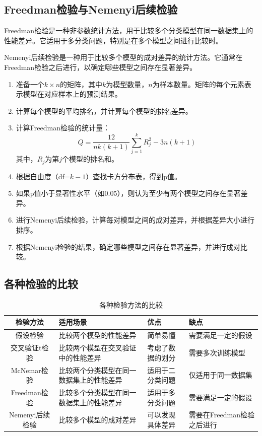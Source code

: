 \subsection{Freedman检验与Nemenyi后续检验}
Freedman检验是一种非参数统计方法，用于比较多个分类模型在同一数据集上的性能差异。它适用于多分类问题，特别是在多个模型之间进行比较时。

Nemenyi后续检验是一种用于比较多个模型的成对差异的统计方法。它通常在Freedman检验之后进行，以确定哪些模型之间存在显著差异。
\begin{enumerate}
    \item 准备一个$k \times n$的矩阵，其中$k$为模型数量，$n$为样本数量。矩阵的每个元素表示模型在对应样本上的预测结果。
    \item 计算每个模型的平均排名，并计算每个模型的排名差异。
    \item 计算Freedman检验的统计量：
    \begin{equation}
        Q = \frac{12}{n k (k + 1)} \sum_{j=1}^{k} R_j^2 - 3n(k + 1)
    \end{equation}
    其中，$R_j$为第$j$个模型的排名和。
    \item 根据自由度（df=$k-1$）查找卡方分布表，得到p值。
    \item 如果p值小于显著性水平（如0.05），则认为至少有两个模型之间存在显著差异。
    \item 进行Nemenyi后续检验，计算每对模型之间的成对差异，并根据差异大小进行排序。
    \item 根据Nemenyi检验的结果，确定哪些模型之间存在显著差异，并进行成对比较。
\end{enumerate}

\subsection{各种检验的比较}
\begin{table}[H]
    \centering
    \captionsetup{justification=centering} %
    \begin{tabular}{c p{4cm} p{3cm} p{3cm}}
        \toprule
        检验方法 & 适用场景 & 优点 & 缺点 \\
        \midrule
        假设检验 & 比较两个模型的性能差异 & 简单易懂 & 需要满足一定的假设 \\

        交叉验证t检验 & 比较两个模型在交叉验证中的性能差异 & 考虑了数据的划分 & 需要多次训练模型 \\
 
        McNemar检验 & 比较两个分类模型在同一数据集上的性能差异 & 适用于二分类问题 & 仅适用于同一数据集 \\
 
        Freedman检验 & 比较多个分类模型在同一数据集上的性能差异 & 适用于多分类问题 & 需要满足一定的假设 \\
 
        Nemenyi后续检验 & 比较多个模型的成对差异 & 可以发现具体差异 & 需要在Freedman检验之后进行 \\
        \bottomrule
    \end{tabular}
    \caption{各种检验方法的比较}
    \label{tab:comparison}
\end{table}

